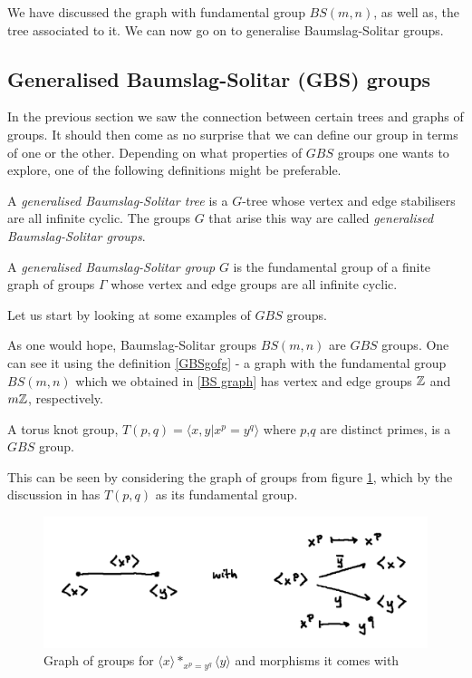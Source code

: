 We have discussed the graph with fundamental group $BS(m,n)$, as well as, the tree associated to it. We can now go on to generalise Baumslag-Solitar groups.

\subsection{Generalised Baumslag-Solitar (GBS) groups}
In the previous section we saw the connection between certain trees and graphs of groups. It should then come as no surprise that we can define our group in terms of one or the other. 
Depending on what properties of $GBS$ groups one wants to explore, one of the following definitions might be preferable.

\begin{definition}
    A \emph{generalised Baumslag-Solitar tree} is a $G$-tree whose vertex and edge stabilisers are all infinite cyclic. The groups $G$ that arise this way are called \emph{generalised Baumslag-Solitar groups}.
\end{definition}

\begin{definition}[\cite{Le07}]\label{GBSgofg}
    A \emph{generalised Baumslag-Solitar group} $G$ is the fundamental group of a finite graph of groups $\Gamma$ whose vertex and edge groups are all infinite cyclic.
\end{definition}

Let us start by looking at some examples of $GBS$ groups.

\begin{example}
    As one would hope, Baumslag-Solitar groups $BS(m,n)$ are $GBS$ groups. One can see it using the definition \ref{GBSgofg} -  a graph with the fundamental group $BS(m,n)$ which we obtained in \ref{BS graph} has vertex and edge groups $\mathbb{Z}$ and $m\mathbb{Z}$, respectively.
\end{example}

\begin{example} 
    A torus knot group, $T(p,q) = \langle x,y | x^p = y^q \rangle$ where $p$,$q$ are distinct primes, is a $GBS$ group.

    This can be seen by considering the graph of groups from figure \ref{T(p,q) graph}, which by the discussion in \cite{Jo23} has $T(p,q)$ as its fundamental group.
\end{example}

\begin{figure}[h]
    \centering
    \includegraphics[width=0.5\linewidth]{sections/alicja/Graph for T(p,q).jpeg}
    \caption{Graph of groups for $\langle x \rangle \ast_{x^p = y^q} \langle y \rangle$ and morphisms it comes with} 
    \label{T(p,q) graph}
\end{figure}

